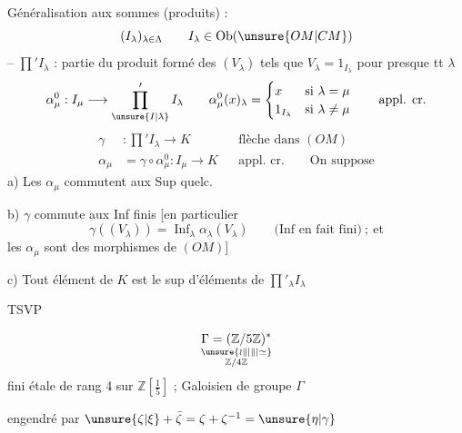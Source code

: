 {Généralisation aux sommes (produits)  :
\[
(I_\lambda)_{\lambda\in\Lambda}\qquad I_\lambda\in\operatorname{Ob}(\unsure{OM|CM})
\]
-- $\prod' I_\lambda$ : partie du produit formé des $(V_\lambda)$ tels que $V_\lambda=1_{I_\lambda}$ pour presque tt $\lambda$
\[
\alpha_\mu^0:I_\mu\longrightarrow\prod'_{\unsure{I|\lambda}} I_\lambda
\qquad\alpha_\mu^0(x)_\lambda=\begin{cases}x&\text{si }\lambda=\mu\\1_{I_\lambda}&\text{si }\lambda\ne\mu\end{cases}
\qquad\text{appl. cr.}
\]
\[
\begin{aligned}
\gamma &: \prod' I_\lambda\longrightarrow K &&\text{flèche dans }(OM)\\
\alpha_\mu&=\gamma\circ\alpha_\mu^0:I_\mu\longrightarrow K &&\text{appl. cr.}\qquad\text{On suppose}
\end{aligned}
\]
a) Les $\alpha_\mu$ commutent aux Sup quelc.

b) $\gamma$ commute aux Inf finis [en particulier
\[
\gamma((V_\lambda))=\mathop{\operatorname{Inf}}_\lambda\alpha_\lambda(V_\lambda)\qquad\text{(Inf en fait fini)}\ ;\ \text{et}
\]
les $\alpha_\mu$ sont des morphismes de $(OM)$]

c) Tout élément de $K$ est le sup d'éléments de $\prod'_\lambda I_\lambda$

TSVP}
\[
\underset{\substack{\unsure{\wr\Vert|\Vert|\simeq}\\\mathbb Z/4\mathbb Z}}{\Gamma=(\mathbb Z/5\mathbb Z)^*}
\]
fini étale de  rang 4 sur $\mathbb Z[\frac15]$ ;  Galoisien de groupe $\Gamma$

engendré par $\unsure{\zeta|\xi}+\bar\zeta=\zeta+\zeta^{-1}=\unsure{\eta|\gamma}$

